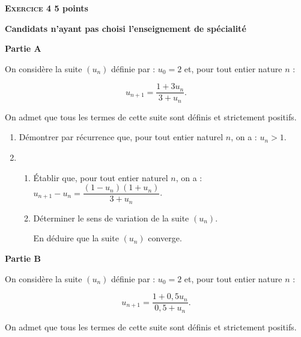 \documentclass[10pt]{article}
\begin{document}
\vspace{0,5cm}

\textbf{\textsc{Exercice 4} \hfill 5 points}

\textbf{Candidats n'ayant pas choisi l'enseignement de spécialité}  

\bigskip

\textbf{Partie A}

\medskip
 
On considère la suite $\left(u_{n}\right)$ définie par : $u_{0} = 2$ et, pour tout entier nature $n$ : 

\[u_{n+1} = \dfrac{1 + 3u_{n}}{3 + u_{n}}.\] 
 
On admet que tous les termes de cette suite sont définis et strictement positifs.

\medskip
 
\begin{enumerate}
\item Démontrer par récurrence que, pour tout entier naturel $n$, on a : $u_{n} > 1$. 
\item  
	\begin{enumerate}
		\item Établir que, pour tout entier naturel $n$, on a : $u_{n+1}- u_{n} = \dfrac{\left(1 - u_{n} \right)\left(1 + u_{n} \right)}{3+ u_{n}}$.
		\item Déterminer le sens de variation de la suite $\left(u_{n}\right)$. 

En déduire que la suite $\left(u_{n}\right)$ converge. 
	\end{enumerate}
\end{enumerate}
	
\bigskip

\textbf{Partie B}

\medskip

On considère la suite $\left(u_{n}\right)$ 	définie par : $u_{0} = 2$ et, pour tout entier nature $n$ :

\[u_{n+1} = \dfrac{1 + 0,5u_{n}}{0,5 + u_{n}}.\]
 
On admet que tous les termes de cette suite sont définis et strictement positifs.

\medskip
 
\end{document}
